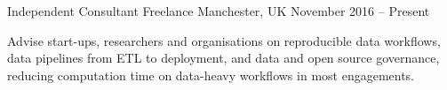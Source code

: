 \cventry
{Independent Consultant}
{Freelance}
{Manchester, UK}
{November 2016 -- Present}
{
\begin{cvitems}
  \item {Advise start-ups, researchers and organisations on reproducible data workflows, data pipelines from ETL to deployment, and data and open source governance, reducing computation time on data-heavy workflows in most engagements.}
\end{cvitems}
}
